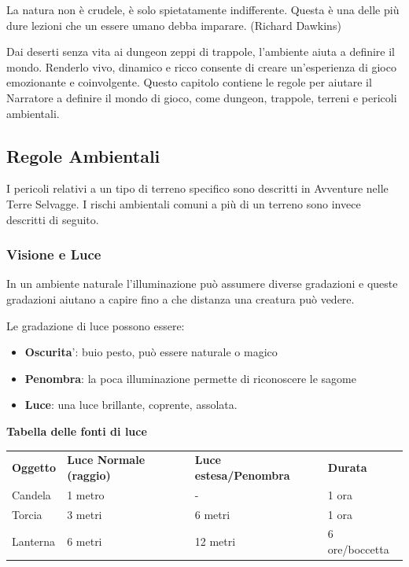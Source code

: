 \documentclass[a4paper,11pt,twoside,openany]{book}
\begin{document}
\label{ambiente}
\begin{tcolorbox}[enhanced,arc=5pt,boxrule=0.3pt]{La natura non è crudele, è solo spietatamente indifferente. Questa è una delle più dure lezioni che un essere umano debba imparare. (Richard Dawkins)}\end{tcolorbox}\medskip

Dai deserti senza vita ai dungeon zeppi di trappole, l'ambiente aiuta a definire il mondo. Renderlo vivo, dinamico e ricco consente di creare un'esperienza di gioco emozionante e coinvolgente. Questo capitolo contiene le regole per aiutare il Narratore a definire il mondo di gioco, come dungeon, trappole, terreni e pericoli ambientali.

\subsection{Regole Ambientali}

\label{regole-ambientali}

I pericoli relativi a un tipo di terreno specifico sono descritti in Avventure nelle Terre Selvagge. I rischi ambientali comuni a più di un terreno sono invece descritti di seguito.

\subsubsection{Visione e Luce}

\label{visione-e-luce}

In un ambiente naturale l'illuminazione può assumere diverse gradazioni e queste gradazioni aiutano a capire fino a che distanza una creatura può vedere.

Le gradazione di luce possono essere:
\begin{itemize}
	\item
	      \textbf{Oscurita}': buio pesto, può essere naturale o magico
	\item
	      \textbf{Penombra}: la poca illuminazione permette di riconoscere le sagome
	\item
	      \textbf{Luce}: una luce brillante, coprente, assolata.
\end{itemize}

\medskip

\textbf{Tabella delle fonti di luce}

\medskip


\begin{tabular}{llll}
	\toprule
	\textbf{Oggetto} & \textbf{Luce Normale (raggio)} & \textbf{Luce estesa/Penombra} & \textbf{Durata}\\
	Candela          & 1 metro         & -              & 1 ora\\
	Torcia           & 3 metri         & 6 metri        & 1 ora\\
	Lanterna         & 6 metri         & 12 metri       & 6 ore/boccetta\\
\end{tabular}
\end{document}
